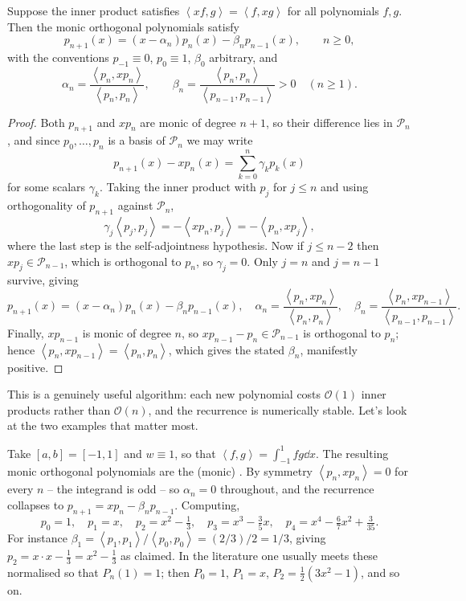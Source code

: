 \documentclass[a4paper]{scrartcl}
\newcommand{\ip}[2]{\left\langle #1, #2 \right\rangle}
\newcommand{\Pn}[1]{\mathcal{P}_{#1}}
\begin{document}
\begin{theorem}\label{thm:threeterm}
  Suppose the inner product satisfies $\ip{xf}{g} = \ip{f}{xg}$ for all polynomials $f, g$. Then the monic orthogonal polynomials satisfy
  $$
  p_{n+1}(x) = (x - \alpha_n)p_n(x) - \beta_n p_{n-1}(x), \qquad n \geq 0,
  $$
  with the conventions $p_{-1} \equiv 0$, $p_0 \equiv 1$, $\beta_0$ arbitrary, and
  $$
  \alpha_n = \frac{\ip{p_n}{xp_n}}{\ip{p_n}{p_n}}, \qquad \beta_n = \frac{\ip{p_n}{p_n}}{\ip{p_{n-1}}{p_{n-1}}} > 0 \quad (n \geq 1).
  $$
\end{theorem}
\begin{proof}
  Both $p_{n+1}$ and $xp_n$ are monic of degree $n+1$, so their difference lies in $\Pn{n}$, and since $p_0, \dots, p_n$ is a basis of $\Pn{n}$ we may write
  $$
  p_{n+1}(x) - xp_n(x) = \sum_{k=0}^{n}\gamma_k p_k(x)
  $$
  for some scalars $\gamma_k$. Taking the inner product with $p_j$ for $j \le n$ and using orthogonality of $p_{n+1}$ against $\Pn{n}$,
  $$
  \gamma_j \ip{p_j}{p_j} = -\ip{xp_n}{p_j} = -\ip{p_n}{xp_j},
  $$
  where the last step is the self-adjointness hypothesis. Now if $j \leq n - 2$ then $xp_j \in \Pn{n-1}$, which is orthogonal to $p_n$, so $\gamma_j = 0$. Only $j = n$ and $j = n-1$ survive, giving
  $$
  p_{n+1}(x) = (x - \alpha_n)p_n(x) - \beta_n p_{n-1}(x), \quad \alpha_n = \frac{\ip{p_n}{xp_n}}{\ip{p_n}{p_n}}, \quad \beta_n = \frac{\ip{p_n}{xp_{n-1}}}{\ip{p_{n-1}}{p_{n-1}}}.
  $$
  Finally, $xp_{n-1}$ is monic of degree $n$, so $xp_{n-1} - p_n \in \Pn{n-1}$ is orthogonal to $p_n$; hence $\ip{p_n}{xp_{n-1}} = \ip{p_n}{p_n}$, which gives the stated $\beta_n$, manifestly positive.
\end{proof}

This is a genuinely useful algorithm: each new polynomial costs $\mathcal{O}(1)$ inner products rather than $\mathcal{O}(n)$, and the recurrence is numerically stable. Let's look at the two examples that matter most.

\begin{example}
  Take $[a,b] = [-1,1]$ and $w \equiv 1$, so that $\ip{f}{g} = \int_{-1}^1 fg \dd x$. The resulting monic orthogonal polynomials are the (monic) . By symmetry $\ip{p_n}{xp_n} = 0$ for every $n$ -- the integrand is odd -- so $\alpha_n = 0$ throughout, and the recurrence collapses to $p_{n+1} = xp_n - \beta_n p_{n-1}$. Computing,
  $$
  p_0 = 1, \quad p_1 = x, \quad p_2 = x^2 - \tfrac{1}{3}, \quad p_3 = x^3 - \tfrac{3}{5}x, \quad p_4 = x^4 - \tfrac{6}{7}x^2 + \tfrac{3}{35}.
  $$
  For instance $\beta_1 = \ip{p_1}{p_1}/\ip{p_0}{p_0} = (2/3)/2 = 1/3$, giving $p_2 = x \cdot x - \tfrac13 = x^2 - \tfrac13$ as claimed. In the literature one usually meets these normalised so that $P_n(1) = 1$; then $P_0 = 1$, $P_1 = x$, $P_2 = \tfrac12(3x^2 - 1)$, and so on.
\end{example}
\end{document}
